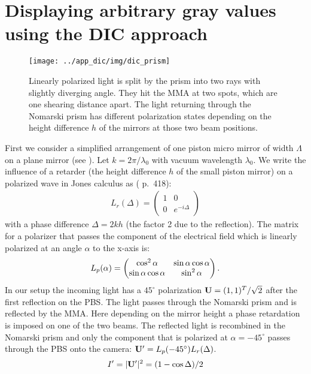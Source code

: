 \section{Displaying arbitrary gray values using the DIC approach}
\begin{figure}[htb]
  \centering
  \texttt{[image: ../app\_dic/img/dic\_prism]}
  \caption{ Linearly polarized light is split by the prism into two
    rays with slightly diverging angle. They hit the MMA at two spots,
    which are one shearing distance apart. The light returning through
    the Nomarski prism has different polarization states depending on
    the height difference $h$ of the mirrors at those two beam
    positions.}
  \label{fig:prism}
\end{figure}
First we consider a simplified arrangement of one piston micro mirror
of width $\Lambda$ on a plane mirror (see ).  Let
$k=2\pi/\lambda_0$ with vacuum wavelength $\lambda_0$. We write the
influence of a retarder (the height difference $h$ of the small piston
mirror) on a polarized wave in Jones calculus as (\cite{Goodman1996}
p.~418):
\begin{align}
L_r(\Delta)=\begin{pmatrix}1&0\\ 0&e^{-i\Delta}\end{pmatrix}
\end{align}
with a phase difference $\Delta=2kh$ (the factor 2 due to the
reflection).  The matrix for a polarizer that passes the component of
the electrical field which is linearly polarized at an angle $\alpha$
to the x-axis is:
\begin{align}
L_p(\alpha)=\begin{pmatrix}\cos^2\alpha&\sin\alpha\cos\alpha\cr
  \sin\alpha\cos\alpha&\sin^2\alpha\end{pmatrix}.
\end{align}
In our setup the incoming light has a $45^\circ$ polarization $\mathbf{U}=(1,1)^T/\sqrt{2}$ after the first reflection on the PBS. The light
passes through the Nomarski prism and is reflected by the MMA. Here
depending on the mirror height a phase retardation is imposed on one
of the two beams. The reflected light is recombined in the Nomarski
prism and only the component that is polarized at $\alpha=-45^\circ$
passes through the PBS onto the camera: $\mathbf{U}'=L_p(-45^\circ)L_r(\Delta)$.
\begin{align}
  I'=|\mathbf{U}'|^2=(1-\cos\Delta)/2
\end{align}
